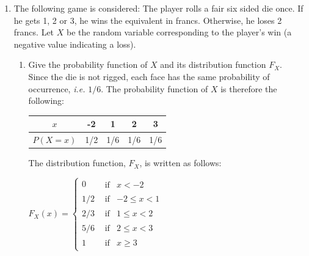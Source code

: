 \documentclass[12pt,thmsa]{article}
\begin{document}
\begin{enumerate}
\item The following game is considered: The player rolls a fair six sided die once. If he gets 1, 2 or 3, he wins the equivalent in francs. Otherwise, he loses 2 francs. Let $ X $ be the random variable corresponding to the player's win (a negative value indicating a loss).

\begin{enumerate}%
\item Give the probability function of $X$ and its distribution function $F_X$.\\

Since the die is not rigged, each face has the same probability of occurrence, {\it i.e.} $ 1/6 $. The probability function of $ X $ is therefore the following:

			\begin{center}
			\begin{tabular}{|c|c|c|c|c|}
			\hline
			$x$ & -2 & 1 & 2 & 3 \\
			\hline
			$P(X=x)$ & 1/2 & 1/6 & 1/6 & 1/6\\
			\hline
			\end{tabular}
			\end{center}

The distribution function, $ F_X $, is written as follows:

            \begin{center}
			$F_X(x)=\begin{cases}
			0 & \begin{array}{cc} \textrm{if} & x<-2\end{array}\\
			1/2 & \begin{array}{cc} \textrm{if} & -2\leq x<1\end{array}\\
			2/3 & \begin{array}{cc}	\textrm{if} & 1\leq x<2\end{array}\\
            5/6 & \begin{array}{cc}	\textrm{if} & 2\leq x<3\end{array}\\
			1 & \begin{array}{cc} \textrm{if} &  x\geq 3\end{array}
			\end{cases}$
			\end{center}


\end{enumerate}
\end{enumerate}
\end{document}
